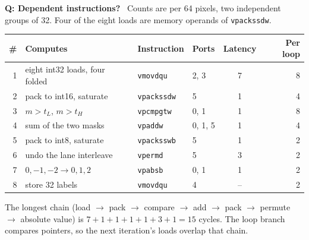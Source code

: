 \documentclass[10pt]{article}
\newcommand{\Q}[1]{\textbf{Q: #1}\ }
\begin{document}
\Q{Dependent instructions?} Counts are per 64 pixels, two independent groups of 32. Four of the eight loads are memory operands of \texttt{vpackssdw}.
\begin{center}\small
\begin{tabular}{rlllcr}
\toprule
\# & Computes & Instruction & Ports & Latency & Per loop \\
\midrule
1 & eight int32 loads, four folded & \texttt{vmovdqu} & 2, 3 & 7 & 8 \\
2 & pack to int16, saturate & \texttt{vpackssdw} & 5 & 1 & 4 \\
3 & $m > t_L$, $m > t_H$ & \texttt{vpcmpgtw} & 0, 1 & 1 & 8 \\
4 & sum of the two masks & \texttt{vpaddw} & 0, 1, 5 & 1 & 4 \\
5 & pack to int8, saturate & \texttt{vpacksswb} & 5 & 1 & 2 \\
6 & undo the lane interleave & \texttt{vpermd} & 5 & 3 & 2 \\
7 & $0,-1,-2 \to 0,1,2$ & \texttt{vpabsb} & 0, 1 & 1 & 2 \\
8 & store 32 labels & \texttt{vmovdqu} & 4 & -- & 2 \\
\bottomrule
\end{tabular}
\end{center}
The longest chain (load $\to$ pack $\to$ compare $\to$ add $\to$ pack $\to$ permute $\to$ absolute value) is $7+1+1+1+1+3+1=15$ cycles. The loop branch compares pointers, so the next iteration's loads overlap that chain.
\end{document}
